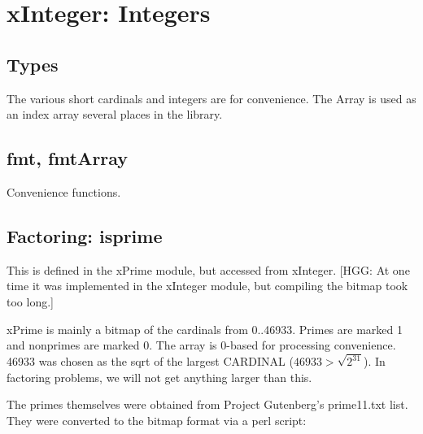 \section{xInteger: Integers}

\subsection*{Types}
The various short cardinals and integers are for convenience.  The
Array is used as an index array several places in the library.

\subsection*{fmt, fmtArray}
Convenience functions.

\subsection*{Factoring: isprime}
This is defined in the xPrime module, but accessed from xInteger.  [HGG: At one
time it was implemented in the xInteger module, but compiling the
bitmap took too long.]

xPrime is mainly a bitmap of the cardinals from
0..46933.  Primes are marked 1 and nonprimes are marked 0.  The array is
0-based for processing convenience.  46933 was chosen as the sqrt of
the largest CARDINAL ($46933 > \sqrt{2^{31}}$).  In factoring problems,
we will not get anything larger than this.

The primes themselves were obtained from Project Gutenberg's prime11.txt
list.  They were converted to the bitmap format via a perl script:


